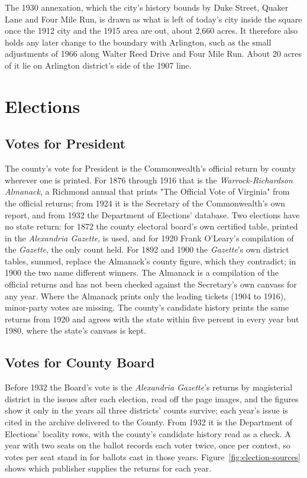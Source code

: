 The 1930 annexation, which the city's history bounds by Duke Street, Quaker Lane and Four
Mile Run, is drawn as what is left of today's city inside the square once the 1912 city
and the 1915 area are out, about 2,660 acres. It therefore also holds any later change to
the boundary with Arlington, such as the small adjustments of 1966 along Walter Reed Drive
and Four Mile Run.\autocite[4]{alexandria2024} About 20 acres of it lie on Arlington
district's side of the 1907 line.

\section*{Elections}

\subsection{Votes for President}
The county's vote for President is the Commonwealth's official return by
county wherever one is printed. For 1876 through 1916 that is the
\textit{Warrock-Richardson Almanack}, a Richmond annual that prints "The
Official Vote of Virginia" from the official returns; from 1924 it is the
Secretary of the Commonwealth's own report, and from 1932 the Department of
Elections' database.\autocite{warrock1868,warrock1892,warrock1900,warrock1911,vasecretary1924,vasecretary1928,vaelections}
Two elections have no state return: for 1872 the county electoral board's own
certified table, printed in the \textit{Alexandria Gazette}, is used, and for
1920 Frank O'Leary's compilation of the \textit{Gazette}, the only count
held.\autocite{alexandriagazette1872official,oleary2010} For 1892 and 1900 the
\textit{Gazette}'s own district tables, summed, replace the Almanack's county
figure, which they contradict; in 1900 the two name different winners. The
Almanack is a compilation of the official returns and has not been checked
against the Secretary's own canvass for any year. Where the Almanack prints
only the leading tickets (1904 to 1916), minor-party votes are missing. The
county's candidate history prints the same returns from 1920 and agrees with
the state within five percent in every year but 1980, where the state's
canvass is kept.\autocite{arlingtonelections2021}

\subsection{Votes for County Board}
Before 1932 the Board's vote is the \textit{Alexandria Gazette}'s returns by
magisterial district in the issues after each election, read off the page
images, and the figures show it only in the years all three districts' counts
survive; each year's issue is cited in the archive delivered to the County.
From 1932 it is the Department of Elections'
locality rows, with the county's candidate history read as a check. A year with
two seats on the ballot records each voter twice, once per contest, so votes
per seat stand in for ballots cast in those years.
Figure~\ref{fig:election-sources} shows which publisher supplies the returns
for each year.

